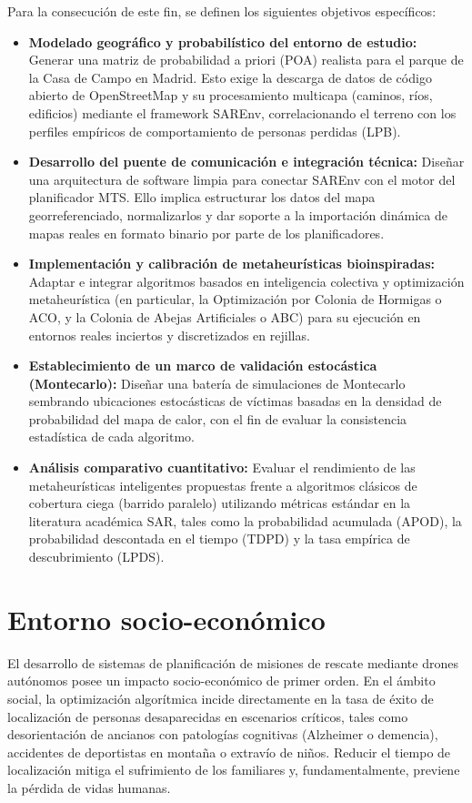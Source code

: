 Para la consecución de este fin, se definen los siguientes objetivos específicos:
\begin{itemize}
    \item \textbf{Modelado geográfico y probabilístico del entorno de estudio:} Generar una matriz de probabilidad a priori (POA) realista para el parque de la Casa de Campo en Madrid. Esto exige la descarga de datos de código abierto de OpenStreetMap y su procesamiento multicapa (caminos, ríos, edificios) mediante el framework SAREnv, correlacionando el terreno con los perfiles empíricos de comportamiento de personas perdidas (LPB).
    \item \textbf{Desarrollo del puente de comunicación e integración técnica:} Diseñar una arquitectura de software limpia para conectar SAREnv con el motor del planificador MTS. Ello implica estructurar los datos del mapa georreferenciado, normalizarlos y dar soporte a la importación dinámica de mapas reales en formato binario por parte de los planificadores.
    \item \textbf{Implementación y calibración de metaheurísticas bioinspiradas:} Adaptar e integrar algoritmos basados en inteligencia colectiva y optimización metaheurística (en particular, la Optimización por Colonia de Hormigas o ACO, y la Colonia de Abejas Artificiales o ABC) para su ejecución en entornos reales inciertos y discretizados en rejillas.
    \item \textbf{Establecimiento de un marco de validación estocástica (Montecarlo):} Diseñar una batería de simulaciones de Montecarlo sembrando ubicaciones estocásticas de víctimas basadas en la densidad de probabilidad del mapa de calor, con el fin de evaluar la consistencia estadística de cada algoritmo.
    \item \textbf{Análisis comparativo cuantitativo:} Evaluar el rendimiento de las metaheurísticas inteligentes propuestas frente a algoritmos clásicos de cobertura ciega (barrido paralelo) utilizando métricas estándar en la literatura académica SAR, tales como la probabilidad acumulada (APOD), la probabilidad descontada en el tiempo (TDPD) y la tasa empírica de descubrimiento (LPDS).
\end{itemize}

\section{Entorno socio-económico}
El desarrollo de sistemas de planificación de misiones de rescate mediante drones autónomos posee un impacto socio-económico de primer orden. En el ámbito social, la optimización algorítmica incide directamente en la tasa de éxito de localización de personas desaparecidas en escenarios críticos, tales como desorientación de ancianos con patologías cognitivas (Alzheimer o demencia), accidentes de deportistas en montaña o extravío de niños. Reducir el tiempo de localización mitiga el sufrimiento de los familiares y, fundamentalmente, previene la pérdida de vidas humanas.

